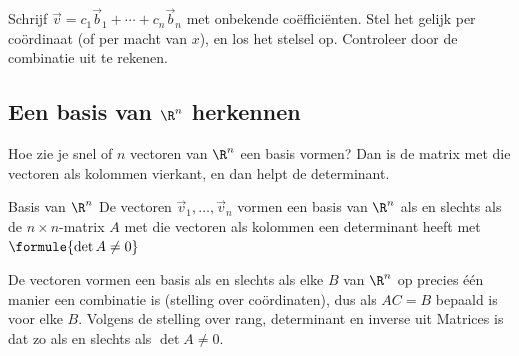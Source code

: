 \begin{werkwijze}
Schrijf $\vec v = c_1\vec b_1 + \cdots + c_n\vec b_n$ met onbekende coëfficiënten. Stel het gelijk per coördinaat (of per macht van $x$), en los het stelsel op. Controleer door de combinatie uit te rekenen.
\end{werkwijze}

\begin{oefeningen}
\end{oefeningen}

\subsection{Een basis van \texorpdfstring{$\R^n$}{Rn} herkennen}

Hoe zie je snel of $n$ vectoren van $\R^n$ een basis vormen? Dan is de matrix met die vectoren als kolommen vierkant, en dan helpt de determinant.

\begin{theorie}
\begin{stelling}{Basis van $\R^n$}
De vectoren $\vec v_1, \ldots, \vec v_n$ vormen een basis van $\R^n$ als en slechts als de $n \times n$-matrix $A$ met die vectoren als kolommen een determinant heeft met $\formule{\det A \neq 0}$
\end{stelling}

\begin{bewijs}
De vectoren vormen een basis als en slechts als elke $B$ van $\R^n$ op precies één manier een combinatie is (stelling over coördinaten), dus als $AC = B$ bepaald is voor elke $B$. Volgens de stelling over rang, determinant en inverse uit Matrices is dat zo als en slechts als $\det A \neq 0$.
\end{bewijs}
\end{theorie}


